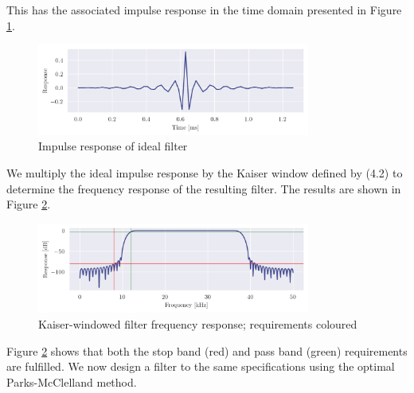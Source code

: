 This has the associated impulse response in the time domain presented in Figure \ref{fig:q4_ideal_impz}.

\begin{figure}[ht]
    \centering
    \includegraphics[width=0.8\textwidth]{images/q4_ideal_impz.png}
    \caption{Impulse response of ideal filter}
    \label{fig:q4_ideal_impz}
\end{figure}

We multiply the ideal impulse response by the Kaiser window defined by (4.2) to determine the frequency response of the resulting filter. The results are shown in Figure \ref{fig:q4_kaiser_freqz}.

\begin{figure}[ht]
    \centering
    \includegraphics[width=0.8\textwidth]{images/q4_kaiser_freqz.png}
    \caption{Kaiser-windowed filter frequency response; requirements coloured}
    \label{fig:q4_kaiser_freqz}
\end{figure}

Figure \ref{fig:q4_kaiser_freqz} shows that both the stop band (red) and pass band (green) requirements are fulfilled. We now design a filter to the same specifications using the optimal Parks-McClelland method.
